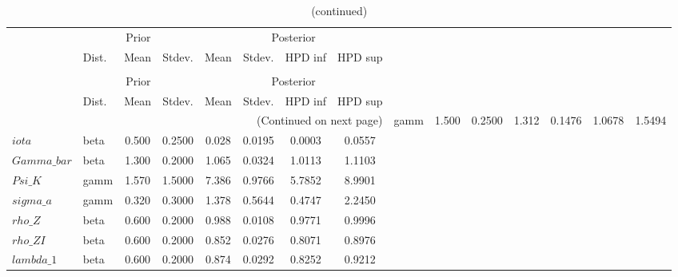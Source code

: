 
\begin{center}
\begin{longtable}{llcccccc} 
\caption{Results from Metropolis-Hastings (parameters)}
 \label{Table:MHPosterior:1}\\
\toprule 
  & \multicolumn{3}{c}{Prior}  &  \multicolumn{4}{c}{Posterior} \\
  \cmidrule(r{.75em}){2-4} \cmidrule(r{.75em}){5-8}
  & Dist. & Mean  & Stdev. & Mean & Stdev. & HPD inf & HPD sup\\
\midrule \endfirsthead 
\caption{(continued)}\\\toprule 
  & \multicolumn{3}{c}{Prior}  &  \multicolumn{4}{c}{Posterior} \\
  \cmidrule(r{.75em}){2-4} \cmidrule(r{.75em}){5-8}
  & Dist. & Mean  & Stdev. & Mean & Stdev. & HPD inf & HPD sup\\
\midrule \endhead 
\bottomrule \multicolumn{8}{r}{(Continued on next page)} \endfoot 
\bottomrule \endlastfoot 
$sigma$ & gamm &   1.500 & 0.2500 &   1.312& 0.1476 &  1.0678 &  1.5494 \\ 
$iota$ & beta &   0.500 & 0.2500 &   0.028& 0.0195 &  0.0003 &  0.0557 \\ 
$Gamma\_bar$ & beta &   1.300 & 0.2000 &   1.065& 0.0324 &  1.0113 &  1.1103 \\ 
$Psi\_K$ & gamm &   1.570 & 1.5000 &   7.386& 0.9766 &  5.7852 &  8.9901 \\ 
$sigma\_a$ & gamm &   0.320 & 0.3000 &   1.378& 0.5644 &  0.4747 &  2.2450 \\ 
$rho\_Z$ & beta &   0.600 & 0.2000 &   0.988& 0.0108 &  0.9771 &  0.9996 \\ 
$rho\_ZI$ & beta &   0.600 & 0.2000 &   0.852& 0.0276 &  0.8071 &  0.8976 \\ 
$lambda\_1$ & beta &   0.600 & 0.2000 &   0.874& 0.0292 &  0.8252 &  0.9212 \\ 
\end{longtable}
 \end{center}
